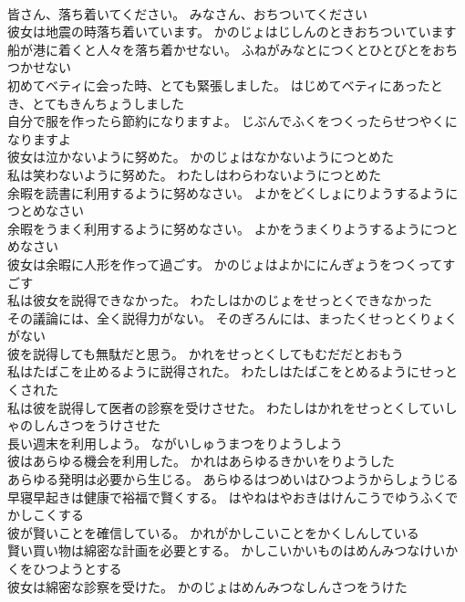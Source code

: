 \documentclass[8pt]{extreport}
\begin{document}
\begin{CJK}{UTF8}{min}
\\	皆さん、落ち着いてください。	みなさん、おちついてください 
\\	彼女は地震の時落ち着いています。	かのじょはじしんのときおちついています 
\\	船が港に着くと人々を落ち着かせない。	ふねがみなとにつくとひとびとをおちつかせない 
\\	初めてベティに会った時、とても緊張しました。	はじめてベティにあったとき、とてもきんちょうしました 
\\	自分で服を作ったら節約になりますよ。	じぶんでふくをつくったらせつやくになりますよ 
\\	彼女は泣かないように努めた。	かのじょはなかないようにつとめた 
\\	私は笑わないように努めた。	わたしはわらわないようにつとめた 
\\	余暇を読書に利用するように努めなさい。	よかをどくしょにりようするようにつとめなさい 
\\	余暇をうまく利用するように努めなさい。	よかをうまくりようするようにつとめなさい 
\\	彼女は余暇に人形を作って過ごす。	かのじょはよかににんぎょうをつくってすごす 
\\	私は彼女を説得できなかった。	わたしはかのじょをせっとくできなかった 
\\	その議論には、全く説得力がない。	そのぎろんには、まったくせっとくりょくがない 
\\	彼を説得しても無駄だと思う。	かれをせっとくしてもむだだとおもう 
\\	私はたばこを止めるように説得された。	わたしはたばこをとめるようにせっとくされた 
\\	私は彼を説得して医者の診察を受けさせた。	わたしはかれをせっとくしていしゃのしんさつをうけさせた 
\\	長い週末を利用しよう。	ながいしゅうまつをりようしよう 
\\	彼はあらゆる機会を利用した。	かれはあらゆるきかいをりようした 
\\	あらゆる発明は必要から生じる。	あらゆるはつめいはひつようからしょうじる 
\\	早寝早起きは健康で裕福で賢くする。	はやねはやおきはけんこうでゆうふくでかしこくする 
\\	彼が賢いことを確信している。	かれがかしこいことをかくしんしている 
\\	賢い買い物は綿密な計画を必要とする。	かしこいかいものはめんみつなけいかくをひつようとする 
\\	彼女は綿密な診察を受けた。	かのじょはめんみつなしんさつをうけた 

\end{CJK}
\end{document}
